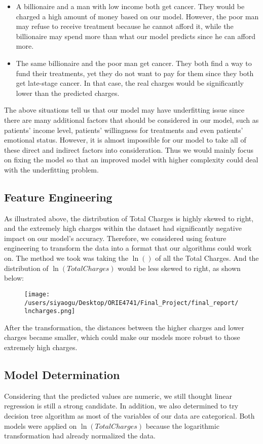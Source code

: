 \documentclass[journal, a4paper,11pt]{IEEEtran}
\begin{document}
	\begin{itemize}
     	\item A billionaire and a man with low income both get cancer. They would be charged a high amount of money based on our model. However, the poor man may refuse to receive treatment because he cannot afford it, while the billionaire may spend more than what our model predicts since he can afford more.
   	\item The same billionaire and the poor man get cancer. They both find a way to fund their treatments, yet they do not want to pay for them since they both get late-stage cancer. In that case, the real charges would be significantly lower than the predicted charges.
   	\end{itemize}

	The above situations tell us that our model may have underfitting issue since there are many additional factors that should be considered in our model, such as patients' income level, patients' willingness for treatments and even patients' emotional status. However, it is almost impossible for our model to take all of these direct and indirect factors into consideration. Thus we would mainly focus on fixing the model so that an improved model with higher complexity could deal with the underfitting problem.

\subsection{Feature Engineering}
	As illustrated above, the distribution of Total Charges is highly skewed to right, and the extremely high charges within the dataset had significantly negative impact on our model's accuracy. Therefore, we considered using feature engineering to transform the data into a format that our algorithms could work on. The method we took was taking the $\ln()$ of all the Total Charges. And the distribution of $\ln(Total Charges)$ would be less skewed to right, as shown below:
	
	\begin{figure}[ht]
	\centering
	\texttt{[image: /users/siyaogu/Desktop/ORIE4741/Final\_Project/final\_report/lncharges.png]}
	\end{figure}
	
	After the transformation, the distances between the higher charges and lower charges became smaller, which could make our models more robust to those extremely high charges.

\subsection{Model Determination}
	Considering that the predicted values are numeric, we still thought linear regression is still a strong candidate. In addition, we also determined to try decision tree algorithm as most of the variables of our data are categorical. Both models were applied on $\ln(Total Charges)$ because the logarithmic transformation had already normalized the data. 
	
\end{document}
